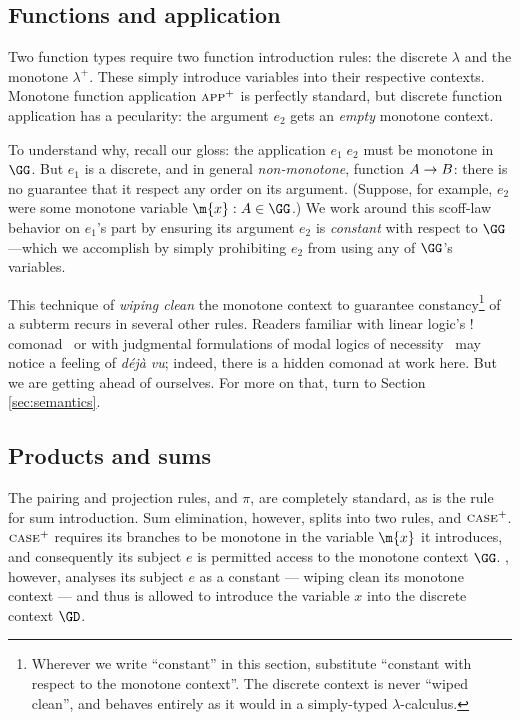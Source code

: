 \subsection{Functions and application}
Two function types require two function introduction rules: the discrete
$\lambda$ and the monotone $\lambda^+$. These simply introduce variables into
their respective contexts. Monotone function application $\textsc{app}^+$ is
perfectly standard, but discrete function application  has a pecularity:
the argument $e_2$ gets an \emph{empty} monotone context.

To understand why, recall our gloss: the application $e_1\;e_2$ must be monotone
in $\GG$. But $e_1$ is a discrete, and in general \emph{non-monotone}, function
$A \to B$: there is no guarantee that it respect any order on its argument.
(Suppose, for example, $e_2$ were some monotone variable $\m{x} : A \in \GG$.)
We work around this scoff-law behavior on $e_1$'s part by ensuring its argument
$e_2$ is \emph{constant} with respect to $\GG$---which we accomplish by simply
prohibiting $e_2$ from using any of $\GG$'s variables.

This technique of \emph{wiping clean} the monotone context to guarantee
constancy\footnote{Wherever we write ``constant'' in this section, substitute
  ``constant with respect to the monotone context''. The discrete context is
  never ``wiped clean'', and behaves entirely as it would in a simply-typed
  $\lambda$-calculus.} of a subterm recurs in several other rules. Readers
familiar with linear logic's $!$ comonad~\cite{linearlogic} or with judgmental
formulations of modal logics of necessity~\cite{jrml} may notice a feeling of
\textit{d\'ej\`a vu}; indeed, there is a hidden comonad at work here. But we are
getting ahead of ourselves. For more on that, turn to Section
\ref{sec:semantics}.

\subsection{Products and sums}
The pairing and projection rules,  and $\pi$, are completely standard,
as is the  rule for sum introduction. Sum elimination, however, splits
into two rules,  and $\textsc{case}^+$. $\textsc{case}^+$ requires its branches
to be monotone in the variable $\m{x}$ it introduces, and consequently its
subject $e$ is permitted access to the monotone context $\GG$. ,
however, analyses its subject $e$ as a constant --- wiping clean its monotone
context --- and thus is allowed to introduce the variable $x$ into the discrete
context $\GD$.

